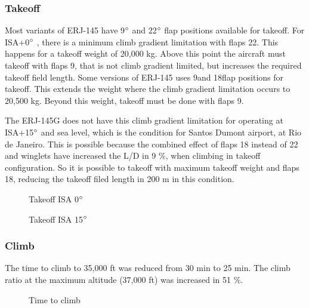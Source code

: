 \subsubsection{Takeoff}

Most variants of ERJ-145 have 9$\degree$ and 22$\degree$ flap positions available for takeoff. For ISA+0$\degree$ , there is a minimum climb gradient limitation with flaps 22. This happens for a takeoff weight of 20,000 kg. Above this point the aircraft must takeoff with flaps 9, that is not climb gradient limited, but increases the required takeoff field length. Some versions of ERJ-145 uses 9\degree and 18\degree flap positions for takeoff. This extends the weight where the climb gradient limitation occurs to 20,500 kg. Beyond this weight, takeoff must be done with flaps 9.

The ERJ-145G does not have this climb gradient limitation for operating at ISA+15$\degree$ and sea level, which is the condition for Santos Dumont airport, at Rio de Janeiro. This is possible because the combined effect of flaps 18 instead of 22 and winglets have increased the L/D in 9 \%, when climbing in takeoff configuration. So it is possible to takeoff with maximum takeoff weight and flaps 18, reducing the takeoff filed length in 200 m in this condition.

\begin{figure}[H] %
\caption{Takeoff ISA 0$\degree$}
\label{fig:fig1_takeoff_isa0}
\end{figure}

\begin{figure}[H] %
\caption{Takeoff ISA 15$\degree$}
\label{fig:fig2_takeoff_isa15}
\end{figure}

\subsubsection{Climb}

The time to climb to 35,000 ft was reduced from 30 min to 25 min. The climb ratio at the maximum altitude (37,000 ft) was increased in 51 \%.

\begin{figure}[H] %
\caption{Time to climb}
\label{fig:fig3_time2climb}
\end{figure}

